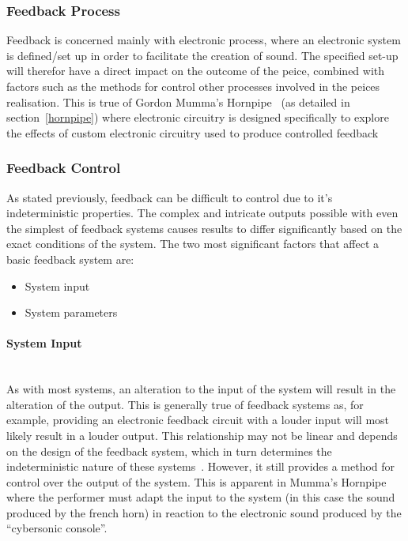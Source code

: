 \documentclass[titlepage]{scrartcl}
\begin{document}
    \subsubsection{Feedback Process}
    Feedback is concerned mainly with electronic process, where an electronic
    system is defined/set up in order to facilitate the creation of sound. The
    specified set-up will therefor have a direct impact on the outcome of the
    peice, combined with factors such as the methods for control other
    processes involved in the peices realisation. This is true of Gordon
    Mumma's Hornpipe~\citeyearpar{mumma2002lem} (as detailed in
    section~\ref{hornpipe}) where electronic circuitry is designed specifically
    to explore the effects of custom electronic circuitry used to produce
    controlled feedback~\parencite[p.8, 390]{nyman1999em}\\

    \subsubsection{Feedback Control}
    As stated previously, feedback can be difficult to control due to it's
    indeterministic properties. The complex and intricate outputs possible with
    even the simplest of feedback systems causes results to differ
    significantly based on the exact conditions of the system. The two most
    significant factors that affect a basic feedback system are:
    \begin{itemize}
        \item System input
        \item System parameters
    \end{itemize}

    \paragraph{System Input}\mbox{}\\ 
    As with most systems, an alteration to the input of the system will result
    in the alteration of the output. This is generally true of feedback systems
    as, for example, providing an electronic feedback circuit with a louder
    input will most likely result in a louder output. This relationship may not
    be linear and depends on the design of the feedback system, which in turn
    determines the indeterministic nature of these
    systems~\parencite[p.19-27]{weisert2010ioi}. However, it still provides a
    method for control over the output of the system. This is apparent in
    Mumma's Hornpipe~\citeyearpar{mumma2002lem} where the performer must adapt
    the input to the system (in this case the sound produced by the french
    horn) in reaction to the electronic sound produced by the ``cybersonic
    console''.
    
\end{document}
